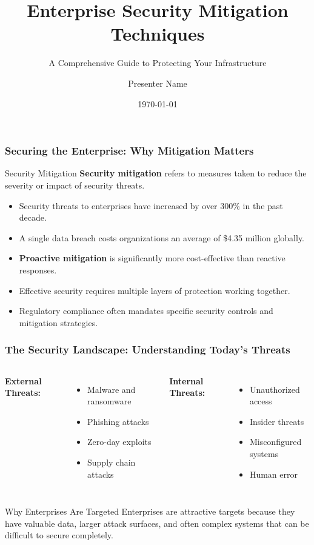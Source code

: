 \documentclass{beamer}
\title{Enterprise Security Mitigation Techniques}
\subtitle{A Comprehensive Guide to Protecting Your Infrastructure}
\author{Presenter Name}
\institute{Institution Name}
\date{\today}
\begin{document}
\frame{\titlepage}

\begin{frame}
\frametitle{Securing the Enterprise: Why Mitigation Matters}

\begin{block}{Security Mitigation}
\textbf{Security mitigation} refers to measures taken to reduce the severity or impact of security threats.
\end{block}

\begin{itemize}
\item Security threats to enterprises have increased by over 300\% in the past decade.
\item A single data breach costs organizations an average of \$4.35 million globally.
\item \textbf{Proactive mitigation} is significantly more cost-effective than reactive responses.
\item Effective security requires multiple layers of protection working together.
\item Regulatory compliance often mandates specific security controls and mitigation strategies.
\end{itemize}
\end{frame}

\begin{frame}
\frametitle{The Security Landscape: Understanding Today's Threats}

\begin{columns}[T]
\textbf{External Threats:}
\begin{itemize}
\item Malware and ransomware
\item Phishing attacks
\item Zero-day exploits
\item Supply chain attacks
\end{itemize}

\textbf{Internal Threats:}
\begin{itemize}
\item Unauthorized access
\item Insider threats
\item Misconfigured systems
\item Human error
\end{itemize}
\end{columns}

\vspace{0.5cm}
\begin{alertblock}{Why Enterprises Are Targeted}
Enterprises are attractive targets because they have valuable data, larger attack surfaces, and often complex systems that can be difficult to secure completely.
\end{alertblock}
\end{frame}
\end{document}
